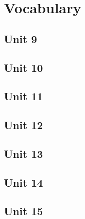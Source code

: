 \chapter{Vocabulary}
\section{Unit 9}
\section{Unit 10}
\section{Unit 11}
\section{Unit 12}
\section{Unit 13}
\section{Unit 14}
\section{Unit 15}

